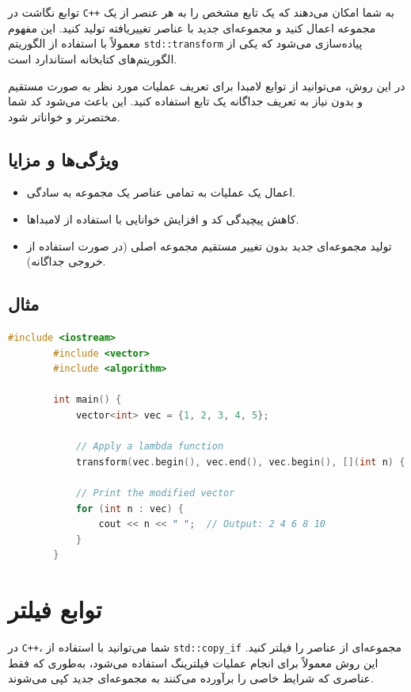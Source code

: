\documentclass[12pt, a4paper]{report}
\begin{document}
توابع نگاشت در \texttt{C++} به شما امکان می‌دهند که یک تابع مشخص را به هر عنصر از یک مجموعه اعمال کنید و مجموعه‌ای جدید با عناصر تغییر‌یافته تولید کنید. این مفهوم معمولاً با استفاده از الگوریتم \texttt{std::transform} پیاده‌سازی می‌شود که یکی از الگوریتم‌های کتابخانه استاندارد است.

در این روش، می‌توانید از توابع لامبدا برای تعریف عملیات مورد نظر به صورت مستقیم و بدون نیاز به تعریف جداگانه یک تابع استفاده کنید. این باعث می‌شود کد شما مختصرتر و خواناتر شود.

\subsection{ویژگی‌ها و مزایا}
\begin{itemize}
	\item اعمال یک عملیات به تمامی عناصر یک مجموعه به سادگی.
	\item کاهش پیچیدگی کد و افزایش خوانایی با استفاده از لامبداها.
	\item تولید مجموعه‌ای جدید بدون تغییر مستقیم مجموعه اصلی (در صورت استفاده از خروجی جداگانه).
\end{itemize}

\subsection{مثال}


\begin{LTR} %
	\begin{lstlisting}[language=C++, breaklines=true]
		#include <iostream>
		#include <vector>
		#include <algorithm>
		
		int main() {
			vector<int> vec = {1, 2, 3, 4, 5};
			
			// Apply a lambda function
			transform(vec.begin(), vec.end(), vec.begin(), [](int n) { return n * 2; });
			
			// Print the modified vector
			for (int n : vec) {
				cout << n << " ";  // Output: 2 4 6 8 10
			}
		}
	\end{lstlisting}
\end{LTR}


\section{توابع فیلتر}

در \texttt{C++}، شما می‌توانید با استفاده از \texttt{std::copy\_if} مجموعه‌ای از عناصر را فیلتر کنید. این روش معمولاً برای انجام عملیات فیلترینگ استفاده می‌شود، به‌طوری که فقط عناصری که شرایط خاصی را برآورده می‌کنند به مجموعه‌ای جدید کپی می‌شوند.
\end{document}
